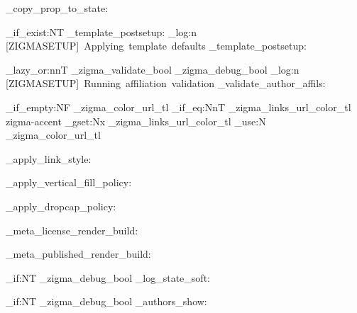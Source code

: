   {
    \zigma_copy_prop_to_state:

    \cs_if_exist:NT \zigma_template_postsetup:
      {
        \zigma_log:n { [ZIGMASETUP]~Applying~template~defaults }
        \zigma_template_postsetup:
      }


    \bool_lazy_or:nnT { \g_zigma_validate_bool } { \g_zigma_debug_bool }
      {
        \zigma_log:n { [ZIGMASETUP]~Running~affiliation~validation }
        \zigma_validate_author_affils:
      }

    \tl_if_empty:NF \g_zigma_color_url_tl
      {
        \tl_if_eq:NnT \g_zigma_links_url_color_tl { zigma-accent }
          { \tl_gset:Nx \g_zigma_links_url_color_tl { \tl_use:N \g_zigma_color_url_tl } }
      }

    \zigma_apply_link_style:

    \zigma_apply_vertical_fill_policy:

    \zigma_apply_dropcap_policy:

    \zigma_meta_license_render_build:

    \zigma_meta_published_render_build:

    \bool_if:NT \g_zigma_debug_bool { \zigma_log_state_soft: }
    
    \bool_if:NT \g_zigma_debug_bool { \zigma_authors_show: }

  }

